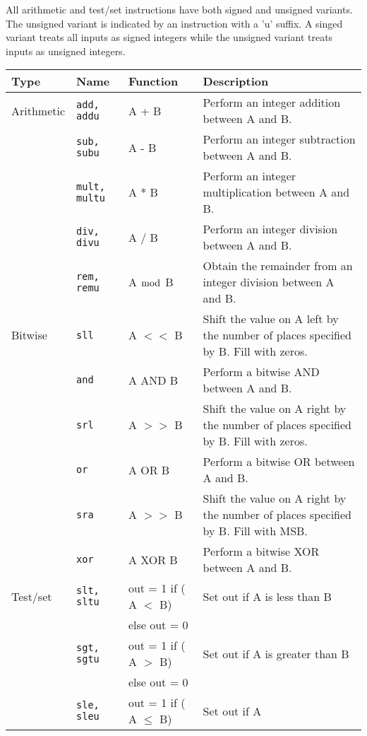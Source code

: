 \documentclass[a4paper,10pt]{article}
\begin{document}
\newpage
\begin{table}[h]
All arithmetic and test/set instructions have both signed and unsigned
variants. The unsigned variant is indicated by an instruction with a
'u' suffix. A singed variant treats all inputs as signed integers while
the unsigned variant treats inputs as unsigned integers.

\begin{center}
\begin{tabular}{|l|l|l|p{75mm}|}
\hline
\textbf{Type} & \textbf{Name} & \textbf{Function} 
& \textbf{Description} \\
\hline
Arithmetic & \texttt{add, addu} & A + B & Perform an integer
addition between A and B. \\
\cline{2-4}
& \texttt{sub, subu} & A - B & Perform an integer
subtraction between A and B. \\
\cline{2-4}
& \texttt{mult, multu} & A * B & Perform an
integer multiplication between A and B. \\
\cline{2-4}
& \texttt{div, divu} & A / B & Perform an integer
division between A and B. \\
\cline{2-4} 
& \texttt{rem, remu} & A $\bmod$ B & Obtain the remainder from an
integer division between A and B. \\
\hline
Bitwise & \texttt{sll} & A $<<$ B & Shift the value on A left by the number of
places specified by B. Fill with zeros. \\
\cline{2-4}
& \texttt{and} & A AND B & Perform a bitwise AND between A and B. \\
\cline{2-4}
& \texttt{srl} & A $>>$ B & Shift the value on A right by the number of places
specified by B. Fill with zeros. \\
\cline{2-4}
& \texttt{or} & A OR B & Perform a bitwise OR between A and B.\\
\cline{2-4}
& \texttt{sra} & A $>>$ B & Shift the value on A right by the number of places
specified by B. Fill with MSB.\\
\cline{2-4}
& \texttt{xor} & A XOR B & Perform a bitwise XOR between A and B. \\
\hline
Test/set & \texttt{slt, sltu} & out = 1 if ( A $<$ B) & Set out if A
is less than B\\
& & else out = 0 & \\
\cline{2-4}
& \texttt{sgt, sgtu} & out = 1 if ( A $>$ B) & Set out if A
is greater than B \\
& & else out = 0 & \\
\cline{2-4}
& \texttt{sle, sleu} & out = 1 if ( A $\le$ B) & Set out if A

\end{tabular}
\end{center}
\end{table}
\end{document}
